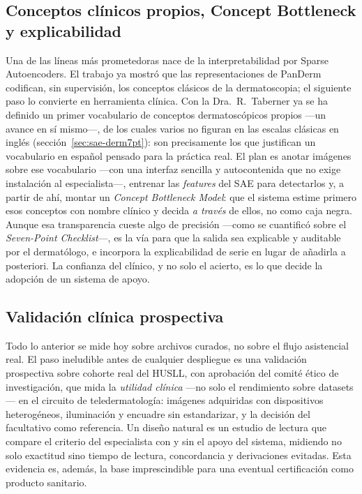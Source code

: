 \subsection{Conceptos clínicos propios, Concept Bottleneck y
explicabilidad}
Una de las líneas más prometedoras nace de la interpretabilidad por Sparse
Autoencoders. El trabajo ya mostró que las representaciones de PanDerm
codifican, sin supervisión, los conceptos clásicos de la dermatoscopia; el
siguiente paso lo convierte en herramienta clínica. Con la
Dra.~R.~Taberner ya se ha definido un primer vocabulario de conceptos
dermatoscópicos propios ---un avance en sí mismo---, de los cuales varios
no figuran en las escalas clásicas en inglés
(sección~\ref{sec:sae-derm7pt}): son precisamente los que justifican un
vocabulario en español pensado para la práctica real. El plan es anotar
imágenes sobre ese vocabulario ---con una interfaz sencilla y autocontenida
que no exige instalación al especialista---, entrenar las \emph{features}
del SAE para detectarlos y, a partir de ahí, montar un \emph{Concept
Bottleneck Model}: que el sistema estime primero esos conceptos con nombre
clínico y decida \emph{a través} de ellos, no como caja negra. Aunque esa
transparencia cueste algo de precisión ---como se cuantificó sobre el
\emph{Seven-Point Checklist}---, es la vía para que la salida sea explicable
y auditable por el dermatólogo, e incorpora la explicabilidad de serie en
lugar de añadirla a posteriori. La confianza del clínico, y no solo el
acierto, es lo que decide la adopción de un sistema de apoyo.

\subsection{Validación clínica prospectiva}
\label{sec:linea-prospectivo}
Todo lo anterior se mide hoy sobre archivos curados, no sobre el flujo
asistencial real. El paso ineludible antes de cualquier despliegue es una
validación prospectiva sobre cohorte real del HUSLL, con aprobación del
comité ético de investigación, que mida la \emph{utilidad clínica} ---no
solo el rendimiento sobre datasets--- en el circuito de teledermatología:
imágenes adquiridas con dispositivos heterogéneos, iluminación y encuadre
sin estandarizar, y la decisión del facultativo como referencia. Un diseño
natural es un estudio de lectura que compare el criterio del especialista
con y sin el apoyo del sistema, midiendo no solo exactitud sino tiempo de
lectura, concordancia y derivaciones evitadas. Esta evidencia es, además,
la base imprescindible para una eventual certificación como producto
sanitario.

